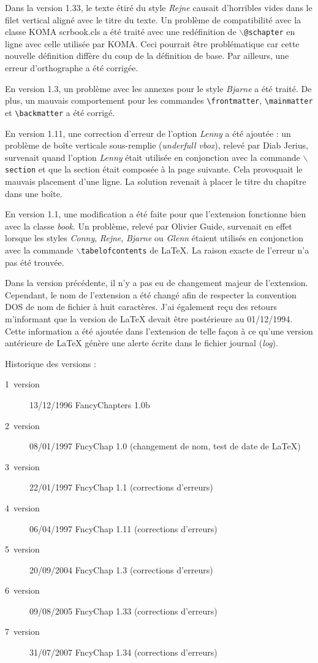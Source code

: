 \documentclass{report}
\newcommand{\A}[1]{{$\backslash${\tt #1}}}
\begin{document}
    Dans la version 1.33, le texte étiré du style \emph{Rejne} causait 
    d'horribles vides dans le filet vertical aligné avec le titre du texte. Un 
    problème de compatibilité avec la classe KOMA \og scrbook.cls \fg{}
    a été traité avec une redéfinition de \A{@schapter} en ligne avec celle 
    utilisée par KOMA. Ceci pourrait être problématique car cette nouvelle 
    définition diffère du coup de la définition de base. Par ailleurs, une 
    erreur d'orthographe a été corrigée.

    En version 1.3, un problème avec les annexes pour le style \emph{Bjarne} a 
    été traité. De plus, un mauvais comportement pour les commandes 
    \verb+\frontmatter+, \verb+\mainmatter+ et \verb+\backmatter+ a été
    corrigé.

    En version 1.11, une correction d'erreur de l'option \emph{Lenny} a été 
    ajoutée : un problème de boîte verticale sous-remplie (\emph{underfull
    vbox}), relevé par Diab Jerius, survenait quand l'option \emph{Lenny}
    était utilisée en conjonction avec la commande \A{section} et que la 
    section était composée à la page suivante. Cela provoquait le mauvais 
    placement d'une ligne. La solution revenait à placer le titre du chapitre
    dans une boîte.

    En version 1.1, une modification a été faite pour que l'extension  
    fonctionne bien avec la classe \emph{book}. Un problème, relevé par Olivier
    Guide, survenait en effet lorsque les styles \emph{Conny}, \emph{Rejne}, 
    \emph{Bjarne} ou \emph{Glenn} étaient utilisés en conjonction avec la 
    commande \A{tabelofcontents} de \LaTeX{}. La raison exacte de l'erreur n'a
    pas été trouvée. 

    Dans la version précédente, il n'y a pas eu de changement majeur de 
    l'extension. Cependant, le nom de l'extension a été changé afin de 
    respecter la convention DOS de nom de fichier à huit caractères. J'ai
    également reçu des retours m'informant que la version de \LaTeX{} devait
    être postérieure au 01/12/1994. Cette information a été ajoutée dans 
    l'extension de telle façon à ce qu'une version antérieure de \LaTeX{} 
    génère une alerte écrite dans le fichier journal (\emph{log}).

    Historique des versions :
      \begin{description}
        \item[1\iere\ version] 13/12/1996 FancyChapters 1.0b
        \item[2\ieme\ version] 08/01/1997 FncyChap 1.0 (changement de nom, test de 
          date de \LaTeX)
        \item[3\ieme\ version] 22/01/1997 FncyChap 1.1 (corrections d'erreurs)
        \item[4\ieme\ version] 06/04/1997 FncyChap 1.11 (corrections d'erreurs)
        \item[5\ieme\ version] 20/09/2004 FncyChap 1.3 (corrections d'erreurs)
        \item[6\ieme\ version] 09/08/2005 FncyChap 1.33 (corrections d'erreurs)
        \item[7\ieme\ version] 31/07/2007 FncyChap 1.34 (corrections d'erreurs)
      \end{description}
\end{document}
